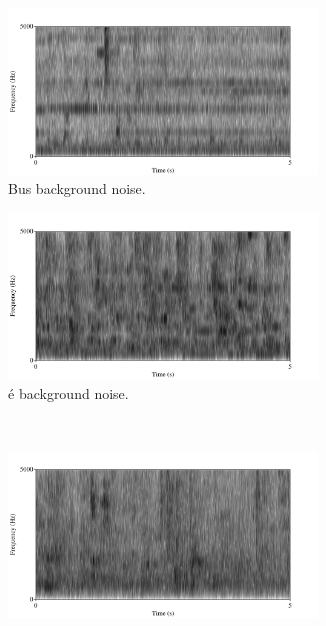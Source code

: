 \begin{figure}[h!]
\begin{subfigure}{0.475\linewidth}
  \centering
  \includegraphics[width=0.9\textwidth]{figure/spctgrm-bus-background.png}
  \caption{Bus background noise.}
  \label{fig:bus-bkgrnd}
\end{subfigure}
\qquad
\begin{subfigure}{0.475\linewidth}
  \centering
  \includegraphics[width=0.9\textwidth]{figure/spctgrm-cafe-background.png}
  \caption{\DIFdelbeginFL {}\DIFdelendFL \DIFaddbeginFL {}\'{e} \DIFaddendFL background noise.}
  \label{fig:cafe-bkgrnd}
\end{subfigure}%
\\[2ex]
\begin{subfigure}{0.475\linewidth}
  \centering
  \includegraphics[width=0.9\textwidth]{figure/spctgrm-ped-background.png}

\end{subfigure}
\end{figure}
